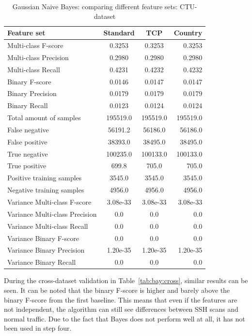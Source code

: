 \begin{table}[H]
\caption{Gaussian Naive Bayes: comparing different feature sets: CTU-dataset}
\label{tab:bay:ctu}
\centering
\begin{tabular}{l c c r}
\toprule
Feature set & Standard & TCP & Country \\
\midrule
Multi-class F-score & 0.3253 & 0.3253 & 0.3253 \\
Multi-class Precision & 0.2980 & 0.2980 & 0.2980 \\
Multi-class Recall & 0.4231 & 0.4232 & 0.4232 \\
\midrule
Binary F-score & 0.0146 & 0.0147 & 0.0147 \\
Binary Precision & 0.0179 & 0.0179 & 0.0179 \\
Binary Recall & 0.0123 & 0.0124 & 0.0124 \\
\midrule
Total amount of samples & 195519.0 & 195519.0 & 195519.0 \\
False negative & 56191.2  & 56186.0 & 56186.0 \\
False positive & 38393.0 & 38495.0 & 38495.0 \\
True negative & 100235.0 & 100133.0 & 100133.0 \\
True positive & 699.8 & 705.0 & 705.0 \\
\midrule
Positive training samples & 3545.0 & 3545.0 & 3545.0\\
Negative training samples & 4956.0 & 4956.0 & 4956.0\\
\midrule
Variance Multi-class F-score & 3.08e-33 & 3.08e-33 & 3.08e-33 \\
Variance Multi-class Precision & 0.0 &  0.0 & 0.0\\
Variance Multi-class Recall &  0.0 & 0.0 &  0.0   \\
\midrule
Variance Binary F-score & 0.0 &  0.0  & 0.0 \\
Variance Binary Precision & 1.20e-35 &  1.20e-35 & 1.20e-35  \\
Variance Binary Recall & 0.0 & 0.0 & 0.0 \\
\bottomrule
\end{tabular}
\end{table}

\noindent During the cross-dataset validation in Table~\ref{tab:bay:cross}, similar results can be seen. It can be noted that the binary F-score is higher and barely above the binary F-score from the first baseline. This means that even if the features are not independent, the algorithm can still see differences between SSH scans and normal traffic. Due to the fact that Bayes does not perform well at all, it has not been used in step four.

